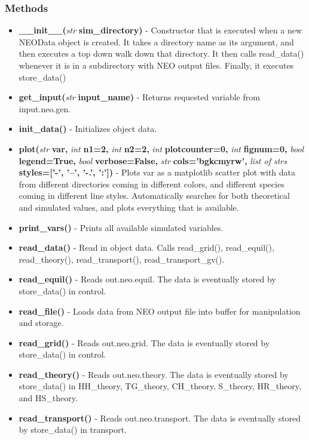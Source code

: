 \documentclass{article}
\begin{document}
\subsubsection{Methods}
\begin{itemize}
\item \textbf{\_\_init\_\_(}\emph{str} \textbf{sim\_directory)} - Constructor that is executed when a new NEOData object is created.  It takes a directory name as its argument, and then executes a top down walk down that directory.  It then calls read\_data() whenever it is in a subdirectory with NEO output files.  Finally, it executes store\_data()
\item \textbf{get\_input(}\emph{str} \textbf{input\_name)} - Returns requested variable from input.neo.gen.
\item \textbf{init\_data()} - Initializes object data.
\item \textbf{plot(}\emph{str} \textbf{var, }\emph{int} \textbf{n1=2, }\emph{int} \textbf{n2=2,} \emph{int} \textbf{plotcounter=0,} \emph{int} \textbf{fignum=0,} \emph{bool} \textbf{legend=True,} \emph{bool} \textbf{verbose=False,} \emph{str} \textbf{cols='bgkcmyrw',} \emph{list of strs} \textbf{styles=['-', '--', '-.', ':'])} - Plots var as a matplotlib scatter plot with data from different directories coming in different colors, and different species coming in different line styles.  Automatically searches for both theoretical and simulated values, and plots everything that is available.
\item \textbf{print\_vars()} - Prints all available simulated variables.
\item \textbf{read\_data()} - Read in object data.  Calls read\_grid(), read\_equil(), read\_theory(), read\_transport(), read\_transport\_gv().
\item \textbf{read\_equil()} - Reads out.neo.equil.  The data is eventually stored by store\_data() in control.
\item \textbf{read\_file()} - Loads data from NEO output file into buffer for manipulation and storage.
\item \textbf{read\_grid()} - Reads out.neo.grid.  The data is eventually stored by store\_data() in control.
\item \textbf{read\_theory()} - Reads out.neo.theory.  The data is eventually stored by store\_data() in HH\_theory, TG\_theory, CH\_theory, S\_theory, HR\_theory, and HS\_theory.
\item \textbf{read\_transport()} - Reads out.neo.transport.  The data is eventually stored by store\_data() in transport.

\end{itemize}
\end{document}
